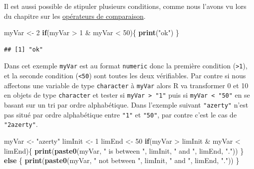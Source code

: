 \documentclass[twoside,symmetric]{book}
\newenvironment{Shaded}{}{}
\newcommand{\ControlFlowTok}[1]{\textbf{#1}}
\newcommand{\DecValTok}[1]{#1}
\newcommand{\KeywordTok}[1]{\textbf{#1}}
\newcommand{\NormalTok}[1]{#1}
\newcommand{\OperatorTok}[1]{#1}
\newcommand{\StringTok}[1]{#1}
\begin{document}
Il est aussi possible de stipuler plusieurs conditions, comme nous l'avons vu lors du chapitre sur les \protect\hyperlink{l011opcomp}{opérateurs de comparaison}.

\begin{Shaded}
\begin{Highlighting}[]
\NormalTok{myVar <-}\StringTok{ }\DecValTok{2}
\ControlFlowTok{if}\NormalTok{(myVar }\OperatorTok{>}\StringTok{ }\DecValTok{1} \OperatorTok{&}\StringTok{ }\NormalTok{myVar }\OperatorTok{<}\StringTok{ }\DecValTok{50}\NormalTok{)\{}
  \KeywordTok{print}\NormalTok{(}\StringTok{"ok"}\NormalTok{)}
\NormalTok{\}}
\end{Highlighting}
\end{Shaded}

\begin{verbatim}
## [1] "ok"
\end{verbatim}

Dans cet exemple \texttt{myVar} est au format \texttt{numeric} donc la première condition (\texttt{\textgreater{}1}), et la seconde condition (\texttt{\textless{}50}) sont toutes les deux vérifiables. Par contre si nous affectons une variable de type \texttt{character} à \texttt{myVar} alors R va transformer 0 et 10 en objets de type \texttt{character} et tester si \texttt{myVar\ \textgreater{}\ "1"} puis si \texttt{myVar\ \textless{}\ "50"} en se basant sur un tri par ordre alphabétique. Dans l'exemple suivant \texttt{"azerty"} n'est pas situé par ordre alphabétique entre \texttt{"1"} et \texttt{"50"}, par contre c'est le cas de \texttt{"2azerty"}.

\begin{Shaded}
\begin{Highlighting}[]
\NormalTok{myVar <-}\StringTok{ "azerty"}
\NormalTok{limInit <-}\StringTok{ }\DecValTok{1}
\NormalTok{limEnd <-}\StringTok{ }\DecValTok{50}
\ControlFlowTok{if}\NormalTok{(myVar }\OperatorTok{>}\StringTok{ }\NormalTok{limInit }\OperatorTok{&}\StringTok{ }\NormalTok{myVar }\OperatorTok{<}\StringTok{ }\NormalTok{limEnd)\{}
  \KeywordTok{print}\NormalTok{(}\KeywordTok{paste0}\NormalTok{(myVar, }\StringTok{" is between "}\NormalTok{, }
\NormalTok{    limInit, }\StringTok{" and "}\NormalTok{, limEnd, }\StringTok{"."}\NormalTok{))}
\NormalTok{\} }\ControlFlowTok{else}\NormalTok{ \{}
  \KeywordTok{print}\NormalTok{(}\KeywordTok{paste0}\NormalTok{(myVar, }\StringTok{" not between "}\NormalTok{, }
\NormalTok{    limInit, }\StringTok{" and "}\NormalTok{, limEnd, }\StringTok{"."}\NormalTok{))}
\NormalTok{\}}
\end{Highlighting}
\end{Shaded}
\end{document}
